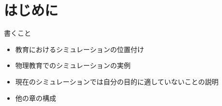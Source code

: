 \chapter{はじめに}

書くこと

\begin{itemize}
\item {
  教育におけるシミュレーションの位置付け
}
\item {
  物理教育でのシミュレーションの実例
}
\item {
  現在のシミュレーションでは自分の目的に適していないことの説明
}
\item{
  他の章の構成
}
\end{itemize}

